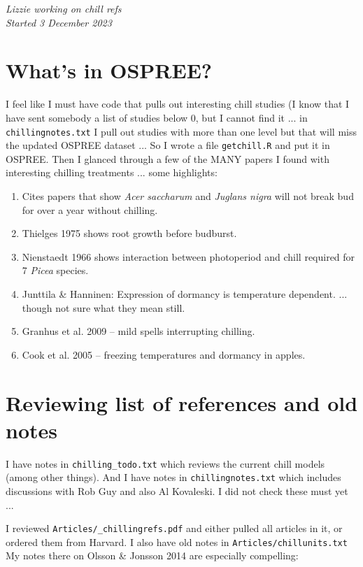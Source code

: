 \documentclass[11pt]{article}
\begin{document}

\renewcommand{\refname}{\CHead{}}


\emph{Lizzie working on chill refs}\\
\emph{Started 3 December 2023}

\section{What's in OSPREE?}
I feel like I must have code that pulls out interesting chill studies (I know that I have sent somebody a list of studies below 0, but I cannot find it ... in \verb|chillingnotes.txt| I pull out studies with more than one level but that will miss the updated OSPREE dataset ... So I wrote a file \verb|getchill.R| and put it in OSPREE. Then I glanced through a few of the MANY papers I found with interesting chilling treatments ... some highlights:

\begin{enumerate}
\item Cites papers that show \emph{Acer saccharum} and \emph{Juglans nigra} will not break bud for over a year without chilling.
\item Thielges 1975 shows root growth before budburst. 
\item Nienstaedt 1966 shows interaction between photoperiod and chill required for 7 \emph{Picea} species.
\item Junttila \& Hanninen: Expression of dormancy is temperature dependent. ... though not sure what they mean still. 
\item Granhus et al. 2009 -- mild spells interrupting chilling.
\item Cook et al. 2005 -- freezing temperatures and dormancy in apples.
\end{enumerate}

\section{Reviewing list of references and old notes}
I have notes in \verb|chilling_todo.txt| which reviews the current chill models (among other things). And I have notes in \verb|chillingnotes.txt| which includes discussions with Rob Guy and also Al Kovaleski. I did not check these must yet ... 

I reviewed \verb|Articles/_chillingrefs.pdf| and either pulled all articles in it, or ordered them from Harvard. I also have old notes in \verb|Articles/chillunits.txt| My notes there on Olsson \& Jonsson 2014 are especially compelling:
\end{document}
